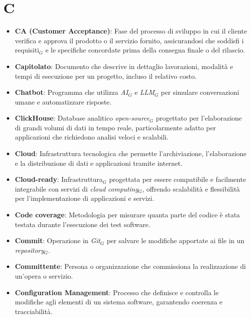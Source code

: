 \section{C}
\begin{itemize}
    \item \textbf{CA (Customer Acceptance)}: Fase del processo di sviluppo in cui il cliente verifica e approva il prodotto o il servizio fornito, assicurandosi che soddisfi i requisiti$_G$ e le specifiche concordate prima della consegna finale o del rilascio.
    \item \textbf{Capitolato}: Documento che descrive in dettaglio lavorazioni, modalità e tempi di esecuzione per un progetto, incluso il relativo costo.
    \item \textbf{Chatbot}: Programma che utilizza \textit{AI}$_G$ e \textit{LLM}$_G$ per simulare conversazioni umane e automatizzare risposte.
    \item \textbf{ClickHouse}: Database analitico \textit{open-source}$_G$ progettato per l'elaborazione di grandi volumi di dati in tempo reale, particolarmente adatto per applicazioni che richiedono analisi veloci e scalabili.
    \item \textbf{Cloud}: Infrastruttura tecnologica che permette l'archiviazione, l'elaborazione e la distribuzione di dati e applicazioni tramite internet.
    \item \textbf{Cloud-ready}: Infrastruttura$_G$ progettata per essere compatibile e facilmente integrabile con servizi di \textit{cloud computing}$_G$, offrendo scalabilità e flessibilità per l'implementazione di applicazioni e servizi.
    \item \textbf{Code coverage}: Metodologia per misurare quanta parte del codice è stata testata durante l'esecuzione dei test software.
    \item \textbf{Commit}: Operazione in \textit{Git}$_G$ per salvare le modifiche apportate ai file in un \textit{repository}$_G$.
    \item \textbf{Committente}: Persona o organizzazione che commissiona la realizzazione di un'opera o servizio.
    \item \textbf{Configuration Management}: Processo che definisce e controlla le modifiche agli elementi di un sistema software, garantendo coerenza e tracciabilità.

\end{itemize}
